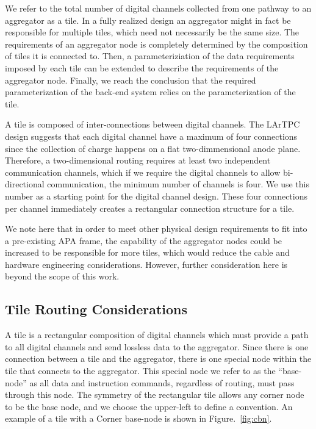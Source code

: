 We refer to the total number of digital channels collected from one pathway to an aggregator as a tile.
In a fully realized design an aggregator might in fact be responsible for multiple tiles, which need not necessarily be the same size.
The requirements of an aggregator node is completely determined by the composition of tiles it is connected to.
Then, a parameteriziation of the data requirements imposed by each tile can be extended to describe the requirements of the aggregator node.
Finally, we reach the conclusion that the required parameterization of the back-end system relies on the parameterization of the tile.

A tile is composed of inter-connections between digital channels.
The LArTPC design suggests that each digital channel have a maximum of four connections since the collection of charge happens on a flat two-dimmensional anode plane.
Therefore, a two-dimensional routing requires at least two independent communication channels, which if we require the digital channels to allow bi-directional communication, the minimum number of channels is four.
We use this number as a starting point for the digital channel design.
These four connections per channel immediately creates a rectangular connection structure for a tile.

We note here that in order to meet other physical design requirements to fit into a pre-existing APA frame, the capability of the aggregator nodes could be increased to be responsible for more tiles, which would reduce the cable and hardware engineering considerations.
However, further consideration here is beyond the scope of this work.

\subsection{Tile Routing Considerations}

A tile is a rectangular composition of digital channels which must provide a path to all digital channels and send lossless data to the aggregator.
Since there is one connection between a tile and the aggregator, there is one special node within the tile that connects to the aggregator.
This special node we refer to as the ``base-node'' as all data and instruction commands, regardless of routing, must pass through this node.
The symmetry of the rectangular tile allows any corner node to be the base node, and we choose the upper-left to define a convention.
An example of a tile with a Corner base-node is shown in Figure.~\ref{fig:cbn}.

